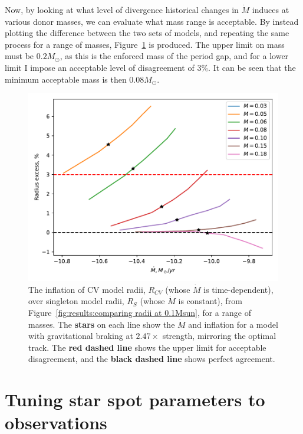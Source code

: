 Now, by looking at what level of divergence historical changes in $\dot M$ induces at various donor masses, we can evaluate what mass range is acceptable.
By instead plotting the difference between the two sets of models, and repeating the same process for a range of masses, Figure~\ref{fig:results:comparing radii over a range of masses} is produced.
The upper limit on mass must be $0.2 M_\odot$, as this is the enforced mass of the period gap, and for a lower limit I impose an acceptable level of disagreement of $3\%$. It can be seen that the minimum acceptable mass is then $0.08 M_\odot$.
\begin{figure}
    \centering
    \includegraphics[width=\textwidth]{figures/modelling/compare_multiple_mass_with_CV_K11_fig1a.pdf}
    \caption{The inflation of CV model radii, $R_{CV}$ (whose $\dot M$ is time-dependent), over singleton model radii, $R_S$ (whose $\dot M$ is constant), from Figure~\ref{fig:results:comparing radii at 0.1Msun}, for a range of masses. The {\bf stars} on each line show the $\dot M$ and inflation for a model with gravitational braking at $2.47\times$ strength, mirroring the \citet{knigge11} optimal track. The {\bf red dashed line} shows the upper limit for acceptable disagreement, and the {\bf black dashed line} shows perfect agreement.}
    \label{fig:results:comparing radii over a range of masses}
\end{figure}


\newpage
\section{Tuning star spot parameters to observations}
\label{sect:modelling:tuning star spots to observations}

